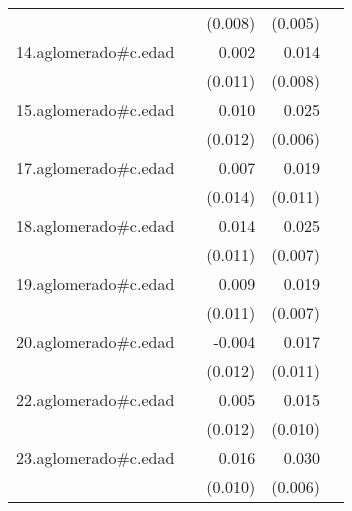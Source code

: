 {\begin{longtable}{l*{4}{D{.}{.}{-1}}}
            &                     &     (0.008)         &     (0.005)         &                     \\
\addlinespace
14.aglomerado#c.edad&                     &       0.002         &       0.014         &                     \\
            &                     &     (0.011)         &     (0.008)         &                     \\
\addlinespace
15.aglomerado#c.edad&                     &       0.010         &       0.025\sym{***}&                     \\
            &                     &     (0.012)         &     (0.006)         &                     \\
\addlinespace
17.aglomerado#c.edad&                     &       0.007         &       0.019         &                     \\
            &                     &     (0.014)         &     (0.011)         &                     \\
\addlinespace
18.aglomerado#c.edad&                     &       0.014         &       0.025\sym{***}&                     \\
            &                     &     (0.011)         &     (0.007)         &                     \\
\addlinespace
19.aglomerado#c.edad&                     &       0.009         &       0.019\sym{**} &                     \\
            &                     &     (0.011)         &     (0.007)         &                     \\
\addlinespace
20.aglomerado#c.edad&                     &      -0.004         &       0.017         &                     \\
            &                     &     (0.012)         &     (0.011)         &                     \\
\addlinespace
22.aglomerado#c.edad&                     &       0.005         &       0.015         &                     \\
            &                     &     (0.012)         &     (0.010)         &                     \\
\addlinespace
23.aglomerado#c.edad&                     &       0.016         &       0.030\sym{***}&                     \\
            &                     &     (0.010)         &     (0.006)         &                     \\

\end{longtable}}
